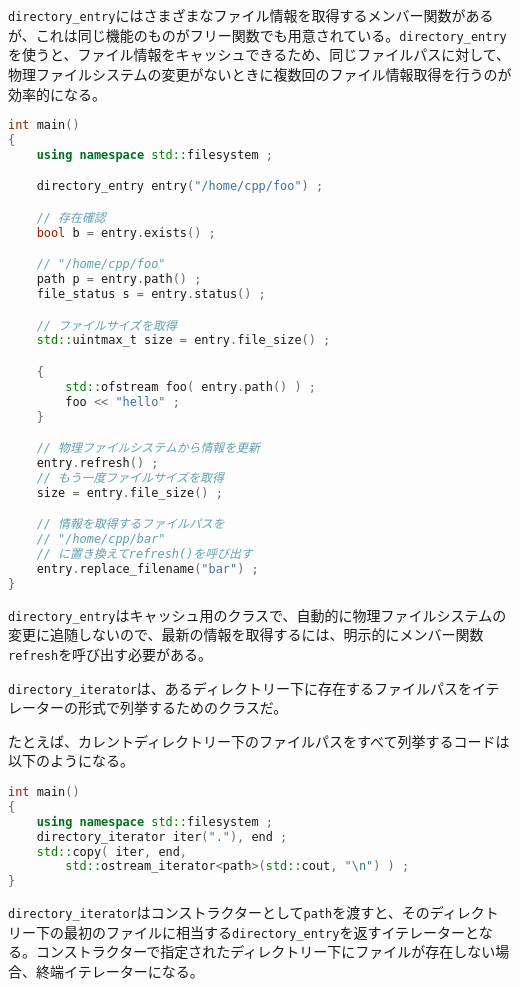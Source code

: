 \lstinline!directory_entry!にはさまざまなファイル情報を取得するメンバー関数があるが、これは同じ機能のものがフリー関数でも用意されている。\lstinline!directory_entry!を使うと、ファイル情報をキャッシュできるため、同じファイルパスに対して、物理ファイルシステムの変更がないときに複数回のファイル情報取得を行うのが効率的になる。

\begin{lstlisting}[language=C++]
int main()
{
    using namespace std::filesystem ;

    directory_entry entry("/home/cpp/foo") ;

    // 存在確認
    bool b = entry.exists() ;

    // "/home/cpp/foo"
    path p = entry.path() ;
    file_status s = entry.status() ;

    // ファイルサイズを取得
    std::uintmax_t size = entry.file_size() ;

    {
        std::ofstream foo( entry.path() ) ;
        foo << "hello" ;
    }

    // 物理ファイルシステムから情報を更新
    entry.refresh() ;
    // もう一度ファイルサイズを取得
    size = entry.file_size() ;

    // 情報を取得するファイルパスを
    // "/home/cpp/bar"
    // に置き換えてrefresh()を呼び出す
    entry.replace_filename("bar") ;
}
\end{lstlisting}

\lstinline!directory_entry!はキャッシュ用のクラスで、自動的に物理ファイルシステムの変更に追随しないので、最新の情報を取得するには、明示的にメンバー関数\lstinline!refresh!を呼び出す必要がある。

%

\lstinline!directory_iterator!は、あるディレクトリー下に存在するファイルパスをイテレーターの形式で列挙するためのクラスだ。

たとえば、カレントディレクトリー下のファイルパスをすべて列挙するコードは以下のようになる。

\begin{lstlisting}[language=C++]
int main()
{
    using namespace std::filesystem ;
    directory_iterator iter("."), end ;
    std::copy( iter, end,
        std::ostream_iterator<path>(std::cout, "\n") ) ;
}
\end{lstlisting}

\lstinline!directory_iterator!はコンストラクターとして\lstinline!path!を渡すと、そのディレクトリー下の最初のファイルに相当する\lstinline!directory_entry!を返すイテレーターとなる。コンストラクターで指定されたディレクトリー下にファイルが存在しない場合、終端イテレーターになる。

